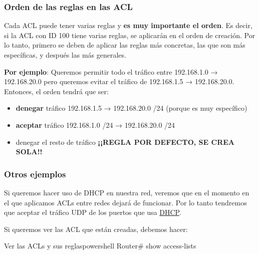 \subsubsection{Orden de las reglas en las ACL}
Cada ACL puede tener varias reglas y \textbf{es muy importante el orden}. Es decir, si la ACL con ID 100 tiene varias reglas, se aplicarán en el orden de creación. Por lo tanto, primero se deben de aplicar las reglas más concretas, las que son más específicas, y después las más generales.

\textbf{Por ejemplo}: Queremos permitir todo el tráfico entre 192.168.1.0 → 192.168.20.0 pero queremos evitar el tráfico de 192.168.1.5 → 192.168.20.0. Entonces, el orden tendrá que ser:

\begin{itemize}
    \item \textbf{denegar} tráfico 192.168.1.5 → 192.168.20.0 /24 (porque es muy específico)
    \item \textbf{aceptar} tráfico 192.168.1.0 /24 → 192.168.20.0 /24
    \item denegar el resto de tráfico \textbf{¡¡REGLA POR DEFECTO, SE CREA SOLA!!}
\end{itemize}


\subsubsection{Otros ejemplos}
Si queremos hacer uso de DHCP en nuestra red, veremos que en el momento en el que aplicamos ACLs entre redes dejará de funcionar. Por lo tanto tendremos que aceptar el tráfico UDP de los puertos que usa \hyperlink{dhcp}{DHCP}.

Si queremos ver las ACL que están creadas, debemos hacer:
\begin{mycode}{Ver las ACLs y sus reglas}{powershell}{}
Router# show access-lists
\end{mycode}

